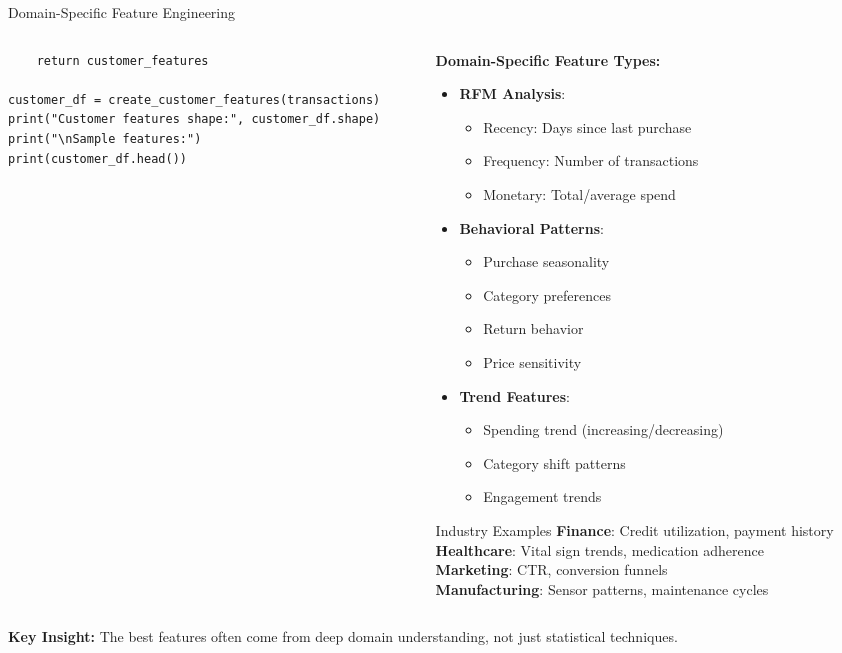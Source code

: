 \documentclass[aspectratio=169,11pt]{beamer}
\begin{document}
\begin{frame}[fragile]{Domain-Specific Feature Engineering}
\begin{columns}
\begin{column}{0.55\textwidth}
\begin{lstlisting}
    return customer_features

customer_df = create_customer_features(transactions)
print("Customer features shape:", customer_df.shape)
print("\nSample features:")
print(customer_df.head())
\end{lstlisting}
\end{column}
\begin{column}{0.45\textwidth}
\textbf{Domain-Specific Feature Types:}

\begin{itemize}
\item \textbf{RFM Analysis}:
  \begin{itemize}
  \item Recency: Days since last purchase
  \item Frequency: Number of transactions
  \item Monetary: Total/average spend
  \end{itemize}

\item \textbf{Behavioral Patterns}:
  \begin{itemize}
  \item Purchase seasonality
  \item Category preferences
  \item Return behavior
  \item Price sensitivity
  \end{itemize}

\item \textbf{Trend Features}:
  \begin{itemize}
  \item Spending trend (increasing/decreasing)
  \item Category shift patterns
  \item Engagement trends
  \end{itemize}
\end{itemize}

\begin{block}{Industry Examples}
\textbf{Finance}: Credit utilization, payment history\\
\textbf{Healthcare}: Vital sign trends, medication adherence\\
\textbf{Marketing}: CTR, conversion funnels\\
\textbf{Manufacturing}: Sensor patterns, maintenance cycles
\end{block}
\end{column}
\end{columns}

\textbf{Key Insight:} The best features often come from deep domain understanding, not just statistical techniques.
\end{frame}
\end{document}
